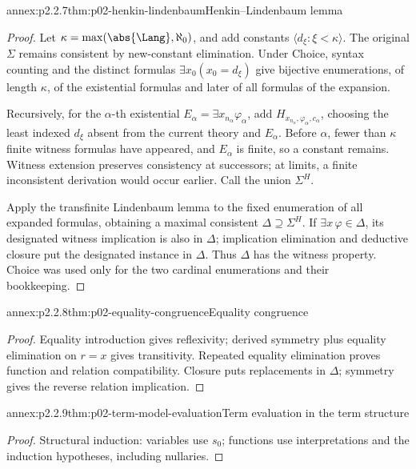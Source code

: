 \begin{annexitem}{annex:p2.2.7}{thm:p02-henkin-lindenbaum}{Henkin--Lindenbaum lemma}
\begin{proof}
Let \(\kappa=\max(\abs{\Lang},\aleph_0)\), and add constants
\(\langle d_\xi:\xi<\kappa\rangle\).  The original \(\Sigma\) remains
consistent by new-constant elimination.  Under Choice, syntax counting and
the distinct formulas \(\exists x_0(x_0=d_\xi)\) give bijective
enumerations, of length \(\kappa\), of the existential formulas and later of
all formulas of the expansion.

Recursively, for the \(\alpha\)-th existential
\(E_\alpha=\exists x_{n_\alpha}\varphi_\alpha\), add
\(H_{x_{n_\alpha},\varphi_\alpha,c_\alpha}\), choosing the least indexed
\(d_\xi\) absent from the current theory and \(E_\alpha\).  Before
\(\alpha\), fewer than \(\kappa\) finite witness formulas have appeared,
and \(E_\alpha\) is finite, so a constant remains.  Witness extension
preserves consistency at successors; at limits, a finite inconsistent
derivation would occur earlier.  Call the union \(\Sigma^H\).

Apply the transfinite Lindenbaum lemma to the fixed enumeration of all
expanded formulas, obtaining a maximal consistent
\(\Delta\supseteq\Sigma^H\).  If \(\exists x\,\varphi\in\Delta\), its
designated witness implication is also in \(\Delta\); implication
elimination and deductive closure put the designated instance in \(\Delta\).
Thus \(\Delta\) has the witness property.  Choice was used only for the two
cardinal enumerations and their bookkeeping.
\end{proof}
\end{annexitem}

\begin{annexitem}{annex:p2.2.8}{thm:p02-equality-congruence}{Equality congruence}
\begin{proof}
Equality introduction gives reflexivity; derived symmetry plus equality
elimination on \(r=x\) gives transitivity.  Repeated equality elimination proves
function and relation compatibility.  Closure puts replacements in
\(\Delta\); symmetry gives the reverse relation implication.
\end{proof}
\end{annexitem}

\begin{annexitem}{annex:p2.2.9}{thm:p02-term-model-evaluation}{Term evaluation in the term structure}
\begin{proof}
Structural induction: variables use \(s_0\); functions use
interpretations and the induction hypotheses, including nullaries.
\end{proof}
\end{annexitem}

